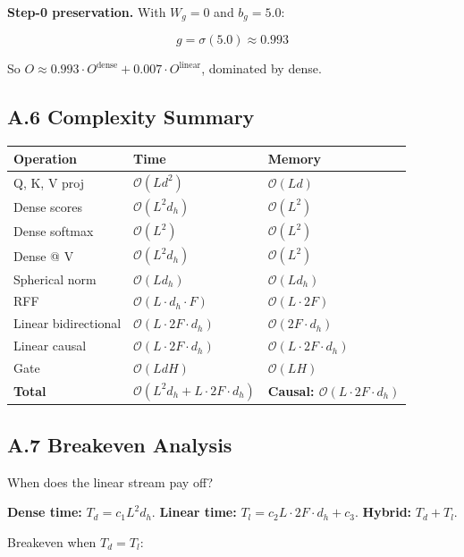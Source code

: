 \textbf{Step-0 preservation.} With $W_g = 0$ and $b_g = 5.0$:

\[
g = \sigma(5.0) \approx 0.993
\]

So $O \approx 0.993 \cdot O^\text{dense} + 0.007 \cdot O^\text{linear}$, 
dominated by dense.

\subsection{A.6 Complexity Summary}

\begin{table}[H]
\centering
\small
\begin{tabular}{lll}
\toprule
\textbf{Operation} & \textbf{Time} & \textbf{Memory} \\
\midrule
Q, K, V proj & $\mathcal{O}(L d^2)$ & $\mathcal{O}(L d)$ \\
Dense scores & $\mathcal{O}(L^2 d_h)$ & $\mathcal{O}(L^2)$ \\
Dense softmax & $\mathcal{O}(L^2)$ & $\mathcal{O}(L^2)$ \\
Dense @ V & $\mathcal{O}(L^2 d_h)$ & $\mathcal{O}(L^2)$ \\
Spherical norm & $\mathcal{O}(L d_h)$ & $\mathcal{O}(L d_h)$ \\
RFF & $\mathcal{O}(L \cdot d_h \cdot F)$ & $\mathcal{O}(L \cdot 2F)$ \\
Linear bidirectional & $\mathcal{O}(L \cdot 2F \cdot d_h)$ & $\mathcal{O}(2F \cdot d_h)$ \\
Linear causal & $\mathcal{O}(L \cdot 2F \cdot d_h)$ & $\mathcal{O}(L \cdot 2F \cdot d_h)$ \\
Gate & $\mathcal{O}(L d H)$ & $\mathcal{O}(L H)$ \\
\textbf{Total} & \textbf{$\mathcal{O}(L^2 d_h + L \cdot 2F \cdot d_h)$} & \textbf{Causal: $\mathcal{O}(L \cdot 2F \cdot d_h)$} \\
\bottomrule
\end{tabular}
\end{table}

\subsection{A.7 Breakeven Analysis}

When does the linear stream pay off?

\textbf{Dense time:} $T_d = c_1 L^2 d_h$.
\textbf{Linear time:} $T_l = c_2 L \cdot 2F \cdot d_h + c_3$.
\textbf{Hybrid:} $T_d + T_l$.

Breakeven when $T_d = T_l$:

